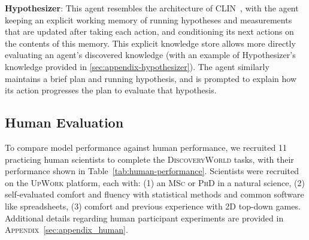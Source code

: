 \documentclass{article}
\newcommand{\env}{\textsc{DiscoveryWorld}\xspace}
\begin{document}
\textbf{Hypothesizer}: This agent resembles the architecture of \textsc{CLIN}~\cite{Majumder2023CLINAC}, with the agent keeping an explicit working memory of running hypotheses and measurements that are updated after taking each action, and conditioning its next actions on the contents of this memory.  This explicit knowledge store allows more directly evaluating an agent's discovered knowledge (with an example of Hypothesizer's knowledge provided in \autoref{sec:appendix-hypothesizer}).  The agent similarly maintains a brief plan and running hypothesis, and is prompted to explain how its action progresses the plan to evaluate that hypothesis. %



\subsection{Human Evaluation}

To compare model performance against human performance, we recruited 11 practicing human scientists to complete the \env tasks, with their performance shown in Table~\ref{tab:human-performance}.  Scientists were recruited on the \textsc{UpWork} platform, each with: (1) an \textsc{MSc} or \textsc{PhD} in a natural science, (2) self-evaluated comfort and fluency with statistical methods and common software like spreadsheets, (3) comfort and previous experience with 2D top-down games.  Additional details regarding human participant experiments are provided in \textsc{Appendix}~\ref{sec:appendix_human}.

\end{document}
